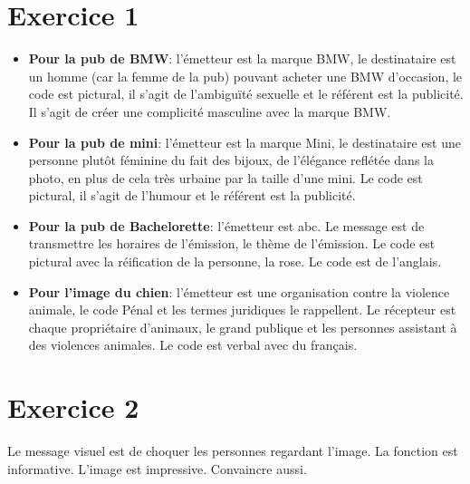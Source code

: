\documentclass[11pt,a4paper,openany]{book}
\begin{document}
\newpage

\section{Exercice 1}

\begin{itemize}
\item \textbf{Pour la pub de BMW}: l'émetteur est la marque BMW, le destinataire est un homme (car la femme de la pub) pouvant acheter une BMW d'occasion, le code est pictural, il s'agit de l'ambiguïté sexuelle et le référent est la publicité. Il s'agit de créer une complicité masculine avec la marque BMW.
\item \textbf{Pour la pub de mini}: l'émetteur est la marque Mini, le destinataire est une personne plutôt féminine du fait des bijoux, de l'élégance reflétée dans la photo, en plus de cela très urbaine par la taille d'une mini. Le code est pictural, il s'agit de l'humour et le référent est la publicité.
\item \textbf{Pour la pub de Bachelorette}: l'émetteur est abc. Le message est de transmettre les horaires de l'émission, le thème de l'émission. Le code est pictural avec la réification de la personne, la rose. Le code est de l'anglais.  
\item \textbf{Pour l'image du chien}: l'émetteur est une organisation contre la violence animale, le code Pénal et les termes juridiques le rappellent. Le récepteur est chaque propriétaire d'animaux, le grand publique et les personnes assistant à des violences animales. Le code est verbal avec du français.
\end{itemize}

\section{Exercice 2}

Le message visuel est de choquer les personnes regardant l'image. La fonction est informative. L'image est impressive. Convaincre aussi.
\end{document}
